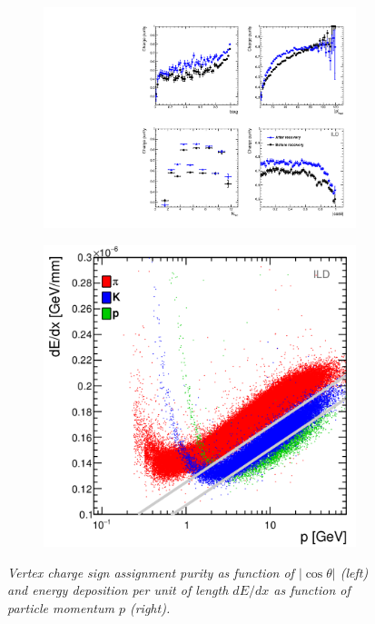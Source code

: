 \documentclass{PoS}
\begin{document}
	\begin{figure}
		\centering
		\begin{subfigure}{0.5\textwidth}
			\centering
			\includegraphics[clip, trim=10cm 0cm 0cm 10cm,width=0.95\linewidth]{../poster/plots/purity-recovery-ild.pdf}
			\caption{\label{fig:thetaepsilonsys} }
		\end{subfigure}%
		\begin{subfigure}{0.5\textwidth}
			\centering
			\includegraphics[width=0.87\linewidth]{../poster/plots/dedx2.png}
			\caption{\label{fig:lepsilonsys} }
		\end{subfigure}
		\caption{\label{fig:Charges_3} \sl Vertex charge sign assignment purity as function of $|\cos\theta|$ (left) and energy deposition per unit of length $dE/dx$ as function of particle momentum $p$ (right).}
	\end{figure}
	
\end{document}
